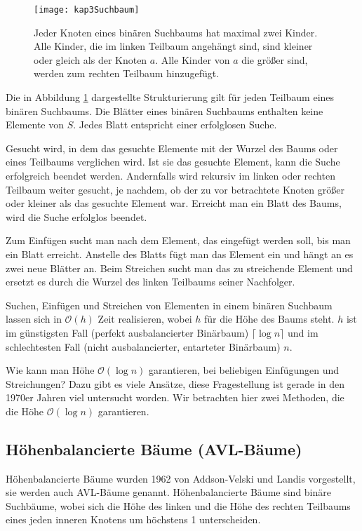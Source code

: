 \begin{figure}[hbt]
  \centering
  \texttt{[image: kap3Suchbaum]}
  \caption{Jeder Knoten eines binären Suchbaums hat maximal zwei Kinder. Alle Kinder, die im linken Teilbaum angehängt sind, sind kleiner oder gleich als der Knoten $a$. Alle Kinder von $a$ die größer sind, werden zum rechten Teilbaum hinzugefügt.}
  \label{kap3Suchbaum}
\end{figure}

Die in Abbildung \ref{kap3Suchbaum} dargestellte Strukturierung gilt für jeden Teilbaum eines binären Suchbaums. Die Blätter eines binären Suchbaums enthalten keine Elemente von $S$. Jedes Blatt entspricht einer erfolglosen Suche.

Gesucht wird, in dem das gesuchte Elemente mit der Wurzel des Baums oder eines Teilbaums verglichen wird. Ist sie das gesuchte Element, kann die Suche erfolgreich beendet werden. Andernfalls wird rekursiv im linken oder rechten Teilbaum weiter gesucht, je nachdem, ob der zu vor betrachtete Knoten größer oder kleiner als das gesuchte Element war. Erreicht man ein Blatt des Baums, wird die Suche erfolglos beendet.

Zum Einfügen sucht man nach dem Element, das eingefügt werden soll, bis man ein Blatt erreicht. Anstelle des Blatts fügt man das Element ein und hängt an es zwei neue Blätter an. Beim Streichen sucht man das zu streichende Element und ersetzt es durch die Wurzel des linken Teilbaums seiner Nachfolger.

Suchen, Einfügen und Streichen von Elementen in einem binären Suchbaum lassen sich in $\mathcal{O}(h)$ Zeit realisieren, wobei $h$ für die Höhe des Baums steht. $h$ ist im günstigsten Fall (perfekt ausbalancierter Binärbaum) $\lceil \log n \rceil$ und im schlechtesten Fall (nicht ausbalancierter, entarteter Binärbaum) $n$.

Wie kann man Höhe $\mathcal{O}(\log n)$ garantieren, bei beliebigen Einfügungen und Streichungen? Dazu gibt es viele Ansätze, diese Fragestellung ist gerade in den 1970er Jahren viel untersucht worden. Wir betrachten hier zwei Methoden, die die Höhe $\mathcal{O}(\log n)$ garantieren.

\subsection{Höhenbalancierte Bäume (AVL-Bäume)}
Höhenbalancierte Bäume wurden 1962 von Addson-Velski und Landis vorgestellt, sie werden auch AVL-Bäume genannt. Höhenbalancierte Bäume sind binäre Suchbäume, wobei sich die Höhe des linken und die Höhe des rechten Teilbaums eines jeden inneren Knotens um höchstens 1 unterscheiden.


